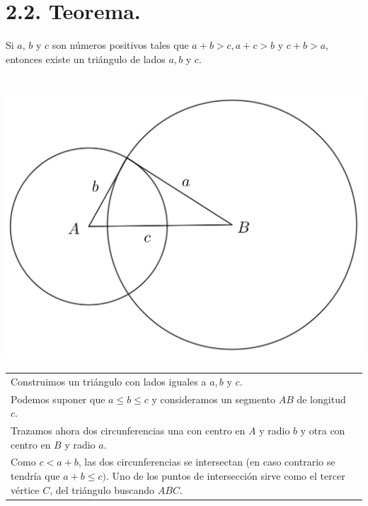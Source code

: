 \documentclass[12pt,a4paper, oneside]{book}
\begin{document}
\section{2.2. Teorema.}
Si $a$, $b$ y $c$ son números positivos tales que $a+b>c, a+c>b$ y $c+b>a$, entonces existe un triángulo de lados $a, b$ y $c$.\\
\\
\begin{center}
\includegraphics[scale=0.45]{Imagenes/demo3.png} 
\end{center}
\begin{tabular}{p{15.9cm} p{1cm}}
\\Construimos un triángulo con lados iguales a $a, b$ y $c$. 
\\Podemos suponer que $a \leq b \leq c$ y consideramos un segmento $AB$ de longitud $c$.
\\Trazamos ahora dos circunferencias una con centro en $A$ y radio $b$ y otra con centro en $B$ y radio $a$.
\\Como $c<a+b$, las dos circunferencias se intersectan (en caso contrario se tendría que $a+b \leq c)$. Uno de los puntos de intersección sirve como el tercer vértice $C$, del triángulo buscando $ABC$.
\end{tabular}
\end{document}
